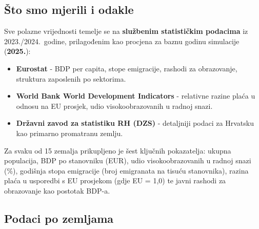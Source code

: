 \documentclass[11pt,a4paper]{article}
\begin{document}
\subsection*{Što smo mjerili i odakle}

Sve polazne vrijednosti temelje se na \textbf{službenim statističkim podacima} iz 2023./2024.\ godine, prilagođenim kao procjena za baznu godinu simulacije (\textbf{2025.}):

\begin{itemize}[noitemsep, topsep=3pt]
  \item \textbf{Eurostat}  - BDP per capita, stope emigracije, rashodi za obrazovanje, struktura zaposlenih po sektorima.
  \item \textbf{World Bank World Development Indicators}  - relativne razine plaća u odnosu na EU prosjek, udio visokoobrazovanih u radnoj snazi.
  \item \textbf{Državni zavod za statistiku RH (DZS)}  - detaljniji podaci za Hrvatsku kao primarno promatranu zemlju.
\end{itemize}

Za svaku od 15 zemalja prikupljeno je šest ključnih pokazatelja: ukupna populacija, BDP po stanovniku (EUR), udio visokoobrazovanih u radnoj snazi (\%), godišnja stopa emigracije (broj emigranata na tisuću stanovnika), razina plaća u usporedbi s EU prosjekom (gdje EU = 1,0) te javni rashodi za obrazovanje kao postotak BDP-a.

\subsection*{Podaci po zemljama}
\end{document}
